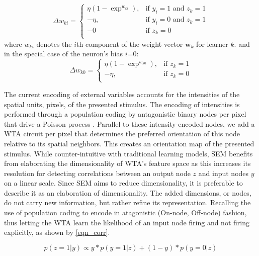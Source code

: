 \documentclass{report}
\begin{document}
\begin{equation}
	    \Delta w_{ki}= 
			\begin{cases}
			    \eta (1-\exp^{w_{ki}}), & \text{if } y_i=1 \text{ and } z_k=1\\
			    -\eta,                  & \text{if } y_i=0 \text{ and } z_k=1\\
			    -0                      & \text{if } z_k=0\\
			\end{cases}
	\label{eqn_rule}
\end{equation}
where $w_{ki}$ denotes the $i$th component of the weight vector $\textbf{w}_k$ for learner $k$.
and in the special case of the neuron's bias $i$=0:
\begin{equation}
	    \Delta w_{k0}= 
			\begin{cases}
			    \eta (1-\exp^{w_{k0}}), & \text{if } z_k=1\\
			    -\eta,                  & \text{if } z_k=0\\
			\end{cases}
	\label{eqn_rule_bias}
\end{equation}

The current encoding of external variables accounts for the intensities of the spatial units, pixels, of the presented stimulus. The encoding of intensities is performed through a population coding by antagonistic binary nodes per pixel that drive a Poisson process \cite{Nessler2010}. Parallel to these intensity-encoded nodes, we add a WTA circuit per pixel that determines the preferred orientation of this node relative to its spatial neighbors. This creates an orientation map of the presented stimulus. While counter-intuitive with traditional learning models, SEM benefits from elaborating the dimensionality of WTA's feature space as this increases its resolution for detecting correlations between an output node $z$ and input nodes $y$ on a linear scale. Since SEM aims to reduce dimensionality, it is preferable to describe it as an elaboration of dimensionality. The added dimensions, or nodes, do not carry new information, but rather refine its representation. Recalling the use of population coding to encode in atagonistic (On-node, Off-node) fashion, thus letting the WTA learn the likelihood of an input node firing and not firing explicitly, as shown by \ref{eqn_corr}.

\begin{equation}
	p(z=1|y) \propto y*p(y=1|z) + (1-y)*p(y=0|z)
	\label{eqn_corr}
\end{equation}
\end{document}
